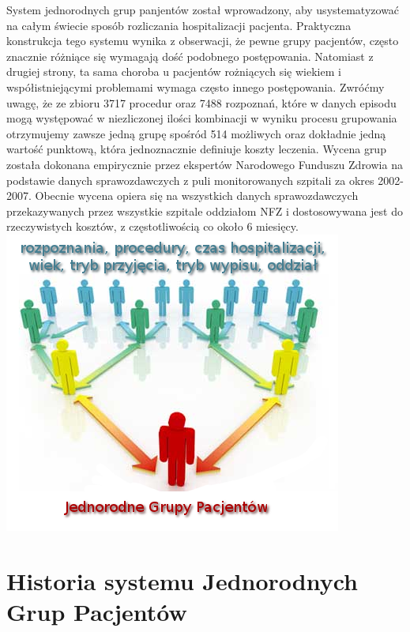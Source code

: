 System jednorodnych grup panjentów został wprowadzony, aby usystematyzować na całym świecie sposób rozliczania hospitalizacji pacjenta. Praktyczna konstrukcja tego systemu wynika z obserwacji, że pewne grupy pacjentów, często znacznie różniące się wymagają dość podobnego postępowania. Natomiast z drugiej strony, ta sama choroba u pacjentów rożniących się wiekiem i współistniejącymi problemami wymaga często innego postępowania.
Zwróćmy uwagę, że ze zbioru 3717 procedur oraz 7488 rozpoznań, które w danych episodu mogą występować w niezliczonej ilości kombinacji w wyniku procesu grupowania otrzymujemy zawsze jedną grupę spośród 514 możliwych oraz dokładnie jedną wartość punktową, która jednoznacznie definiuje koszty leczenia.
Wycena grup została dokonana empirycznie przez ekspertów Narodowego Funduszu Zdrowia na podstawie danych sprawozdawczych z puli monitorowanych szpitali za okres 2002-2007. Obecnie wycena opiera się na wszystkich danych sprawozdawczych przekazywanych przez wszystkie szpitale oddziałom NFZ i dostosowywana jest do rzeczywistych kosztów, z częstotliwością co około 6 miesięcy.
\vspace*{1cm}
\includegraphics{images/standarization}


\section{Historia systemu Jednorodnych Grup Pacjentów}
\label{sec:historiaJGP}

